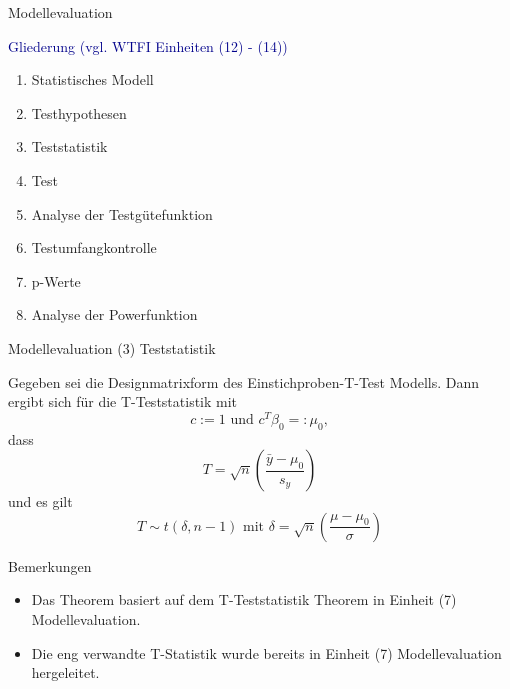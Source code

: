 \documentclass[
  8pt,
  ignorenonframetext,
]{beamer}
\providecommand{\tightlist}{%
  \setlength{\itemsep}{0pt}\setlength{\parskip}{0pt}}
\begin{document}
\begin{frame}{Modellevaluation}
\protect\hypertarget{modellevaluation-3}{}

\textcolor{darkblue}{Gliederung (vgl. WTFI Einheiten (12) - (14))}

\begin{enumerate}
[(1)]
\item
  Statistisches Modell \checkmark
\item
  Testhypothesen \checkmark
\item
  Teststatistik
\item
  Test
\item
  Analyse der Testgütefunktion
\item
  Testumfangkontrolle
\item
  p-Werte
\item
  Analyse der Powerfunktion
\end{enumerate}
\end{frame}

\begin{frame}{Modellevaluation}
\protect\hypertarget{modellevaluation-4}{}
\noindent (3) Teststatistik

\footnotesize
\begin{theorem}
\normalfont
\justifying
Gegeben sei die Designmatrixform des Einstichproben-T-Test Modells. Dann ergibt
sich für die T-Teststatistik mit
\begin{equation}
c := 1 \mbox{ und } c^T\beta_0 =: \mu_0,
\end{equation}
dass
\begin{equation}
T = \sqrt{n}\left(\frac{\bar{y} - \mu_0}{s_y}\right)
\end{equation}
und es gilt
\begin{equation}
T \sim t(\delta, n-1) \mbox{ mit } \delta = \sqrt{n}\left(\frac{\mu - \mu_0}{\sigma}\right)
\end{equation}
\end{theorem}

Bemerkungen

\begin{itemize}
\tightlist
\item
  Das Theorem basiert auf dem T-Teststatistik Theorem in Einheit (7)
  Modellevaluation.
\item
  Die eng verwandte T-Statistik wurde bereits in Einheit (7)
  Modellevaluation hergeleitet.
\end{itemize}
\end{frame}
\end{document}
